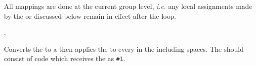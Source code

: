 \documentclass[oneside]{book}
\begin{document}
All mappings are done at the current group level, \emph{i.e.} any
local assignments made by the  or  discussed
below remain in effect after the loop.


\begin{function}{\StrMapInline,\StrVarMapInline}
\begin{syntax}
  
  
\end{syntax}
Converts the  to a  then
applies the  to every  in the
 including spaces.
The  should consist of code which
receives the  as \verb|#1|.
\begin{demohigh}
\IgnoreSpacesOn
\StrClear \lTmpaStr
{} {
  \StrPutRight \lTmpaStr {[#1]}
}
\StrUse \lTmpaStr
\IgnoreSpacesOff
\end{demohigh}
\end{function}

\end{document}
